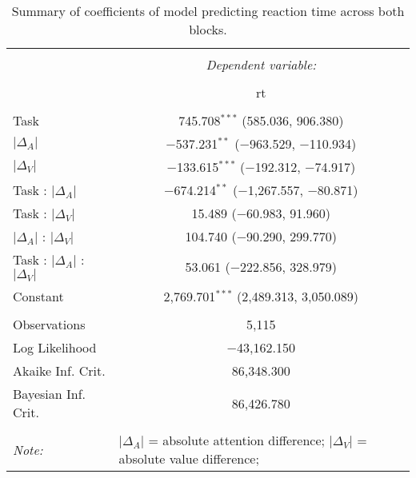
\begin{table}[t] \centering 
  \caption{Summary of coefficients of model predicting reaction time across both blocks.} 
  \label{table:rtModel} 
\begin{tabular}{@{\extracolsep{5pt}}lc} 
\\[-1.8ex]\hline 
\hline \\[-1.8ex] 
 & \multicolumn{1}{c}{\textit{Dependent variable:}} \\ 
\cline{2-2} 
\\[-1.8ex] & rt \\ 
\hline \\[-1.8ex] 
 Task & 745.708$^{***}$ (585.036, 906.380) \\ 
  $\vert\Delta_A\vert$ & $-$537.231$^{**}$ ($-$963.529, $-$110.934) \\ 
  $\vert\Delta_V\vert$ & $-$133.615$^{***}$ ($-$192.312, $-$74.917) \\ 
  Task : $\vert\Delta_A\vert$ & $-$674.214$^{**}$ ($-$1,267.557, $-$80.871) \\ 
  Task : $\vert\Delta_V\vert$ & 15.489 ($-$60.983, 91.960) \\ 
  $\vert\Delta_A\vert$ : $\vert\Delta_V\vert$ & 104.740 ($-$90.290, 299.770) \\ 
  Task : $\vert\Delta_A\vert$ :  $\vert\Delta_V\vert$ & 53.061 ($-$222.856, 328.979) \\ 
  Constant & 2,769.701$^{***}$ (2,489.313, 3,050.089) \\ 
 \hline \\[-1.8ex] 
Observations & 5,115 \\ 
Log Likelihood & $-$43,162.150 \\ 
Akaike Inf. Crit. & 86,348.300 \\ 
Bayesian Inf. Crit. & 86,426.780 \\ 
\hline 
\hline \\[-1.8ex] 
\textit{Note:}  & \multicolumn{1}{l}{\footnotesize $\vert\Delta_A\vert$ = absolute attention difference; $\vert\Delta_V\vert$ = absolute value difference; } \\ 
\end{tabular} 
\end{table} 

